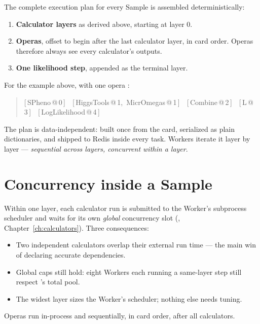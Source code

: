 The complete execution plan for every Sample is assembled deterministically:

\begin{enumerate}
  \item \textbf{Calculator layers} as derived above, starting at layer 0.
  \item \textbf{Operas}, offset to begin after the last calculator layer, in card
        order. Operas therefore always see every calculator's outputs.
  \item \textbf{One likelihood step}, appended as the terminal layer.
\end{enumerate}

For the example above, with one opera :

\begin{quote}
\sffamily\footnotesize
[\,SPheno\,@\,0\,]\ \ [\,HiggsTools\,@\,1,\ MicrOmegas\,@\,1\,]\ \
[\,Combine\,@\,2\,]\ \ [\,L\,@\,3\,]\ \ [\,LogLikelihood\,@\,4\,]
\end{quote}

The plan is data-independent: built once from the card, serialized as plain
dictionaries, and shipped to Redis inside every task. Workers iterate it layer by layer
--- \emph{sequential across layers, concurrent within a layer}.

\section{Concurrency inside a Sample}
\label{sec:sample-concurrency}

Within one layer, each calculator run is submitted to the Worker's subprocess scheduler
and waits for its own \emph{global} concurrency slot
(, Chapter~\ref{ch:calculators}). Three consequences:

\begin{itemize}
  \item Two independent calculators overlap their external run time --- the main win of
        declaring accurate dependencies.
  \item Global caps still hold: eight Workers each running a same-layer
         step still respect \code{MicrOmegas}'s total pool.
  \item The widest layer sizes the Worker's scheduler; nothing else needs tuning.
\end{itemize}

Operas run in-process and sequentially, in card order, after all calculators.


